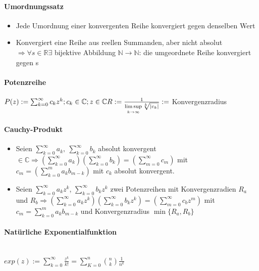 \documentclass[paper=a3,paper=landscape, fontsize=9pt, DIV=30]{scrartcl}
\newcommand{\real}{{\mathbb{R}}}
\newcommand{\compl}{\mathbb{C}}
\newcommand{\nat}{\mathbb{N}}
\begin{document}
\begin{multicols*}{4}
  \paragraph{Umordnungssatz}\begin{itemize}
  \item Jede Umordnung einer konvergenten Reihe konvergiert gegen denselben Wert
  \item Konvergiert eine Reihe aus reellen Summanden, aber nicht absolut $\Rightarrow \forall s \in \real \exists$ bijektive Abbildung $\nat \rightarrow \nat$: die umgeordnete Reihe konvergiert gegen s
\end{itemize}

  \paragraph{Potenzreihe}
    $ P(z) := \sum_{k=0}^{\infty} c_kz^k; c_k \in \compl; z \in \compl\\R := \frac{1}{\limsup\limits_{k \rightarrow \infty} \sqrt[k]{|c_k|}} :=$ Konvergenzradius


  \paragraph{Cauchy-Produkt}
  \begin{itemize}
  \item Seien $ \sum_{k=0}^{\infty} a_k,\:\sum_{k=0}^{\infty} b_k$ absolut konvergent $ \in \compl \Rightarrow (\sum_{k=0}^{\infty} a_k) (\sum_{k=0}^{\infty} b_k) = (\sum_{m=0}^{\infty} c_m)$ mit $ c_m=(\sum_{k=0}^{m} a_kb_{m-k})$ mit $c_k$ absolut konvergent.

  \item Seien $ \sum_{k=0}^{\infty} a_kz^k$, $\sum_{k=0}^{\infty} b_kz^k$ zwei Potenzreihen mit Konvergenzradien $R_a$ und $ R_b \Rightarrow (\sum_{k=0}^{\infty} a_kz^k)(\sum_{k=0}^{\infty} b_kz^k)=(\sum_{m=0}^{\infty} c_bz^m)$ mit $ c_m = \sum_{k=0}^{m} a_kb_{m-k}$ und Konvergenzradius $\min\{R_a,R_b\}$
  \end{itemize}


  \paragraph{Natürliche Exponentialfunktion}\hspace{0pt} \\
  $ exp(z) := \sum_{k=0}^{\infty} \frac{z^k}{k!} = \sum_{K=0}^{n}\binom{n}{k}\frac{1}{n^k}$



\end{multicols*}
\end{document}
